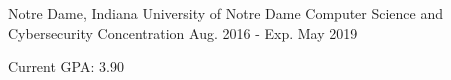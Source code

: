 \begin{cventries}
  \cventry
    {Notre Dame, Indiana}
    {University of Notre Dame}
    {Computer Science and Cybersecurity Concentration}
    {Aug. 2016 - Exp. May 2019}
    {
      \begin{cvitems}
        \item {Current GPA: 3.90}
      \end{cvitems}
    }
\end{cventries}
